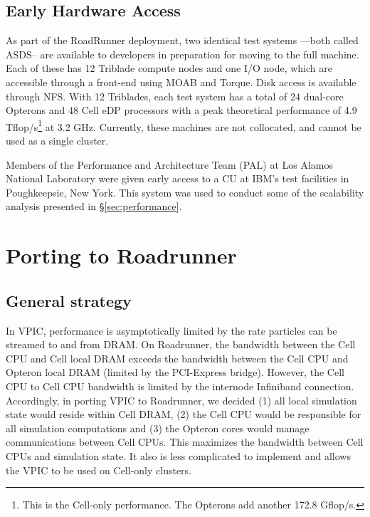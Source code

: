 \documentclass[letter,10pt]{article}
\begin{document}

\subsection*{Early Hardware Access}

As part of the RoadRunner deployment, two identical test systems
---both called ASDS-- are available to developers in preparation
for moving to the full machine.  Each of these has 12 Triblade
compute nodes and one I/O node, which are accessible through a
front-end using MOAB and Torque.  Disk access is available
through NFS.  With 12 Triblades, each test system has a total of
24 dual-core Opterons and 48 Cell eDP processors with a peak
theoretical performance of 4.9 Tflop/s\footnote{This is the
Cell-only performance.  The Opterons add another 172.8 Gflop/s.}
at 3.2 GHz.  Currently, these machines are not collocated,
and cannot be used as a single cluster.


Members of the Performance and Architecture Team (PAL) at
Los Alamos National Laboratory were given early access to a
CU at IBM's test facilities in Poughkeepsie, New York.  This system
was used to conduct some of the scalability analysis presented
in \S \ref{sec:performance}.


\section{Porting to Roadrunner}

\subsection{General strategy}

In VPIC, performance is asymptotically limited by the rate particles
can be streamed to and from DRAM.  On Roadrunner, the bandwidth
between the Cell CPU and Cell local DRAM exceeds the bandwidth between
the Cell CPU and Opteron local DRAM (limited by the PCI-Express
bridge).  However, the Cell CPU to Cell CPU bandwidth is limited by
the internode Infiniband connection.  Accordingly, in porting VPIC to
Roadrunner, we decided (1) all local simulation state would reside
within Cell DRAM, (2) the Cell CPU would be responsible for all
simulation computations and (3) the Opteron cores would manage
communications between Cell CPUs.  This maximizes the bandwidth
between Cell CPUs and simulation state.  It also is less complicated
to implement and allows the VPIC to be used on Cell-only clusters.
\end{document}
